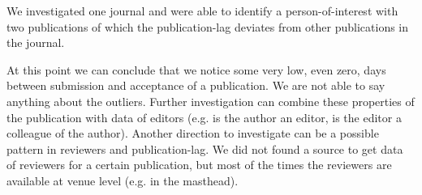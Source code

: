 \documentclass{ou-report}
\begin{document}
We investigated one journal and were able to identify a 
person-of-interest with two publications of which the publication-lag deviates
from other publications in the journal.

At this point we can conclude that we notice some very low, even zero, days 
between submission and acceptance of a publication. We are not able to say 
anything about the outliers. Further 
investigation can combine these properties of the publication with data of 
editors (e.g.
is the author an editor, is the editor a colleague of the author). Another
direction to investigate can be a possible pattern in reviewers and publication-lag.
We did not found a source to get data of reviewers for a certain publication, 
but most of the times the reviewers are available at venue level (e.g. in the masthead).









\end{document}

